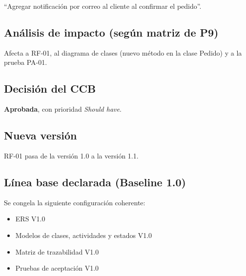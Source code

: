 \documentclass[11pt,a4paper]{article}
\begin{document}
``Agregar notificación por correo al cliente al confirmar el pedido''.

\subsection*{Análisis de impacto (según matriz de P9)}

Afecta a RF-01, al diagrama de clases (nuevo método en la clase Pedido) y a la prueba PA-01.

\subsection*{Decisión del CCB}

\textbf{Aprobada}, con prioridad \emph{Should have}.

\subsection*{Nueva versión}

RF-01 pasa de la versión 1.0 a la versión 1.1.

\subsection*{Línea base declarada (Baseline 1.0)}

Se congela la siguiente configuración coherente:

\begin{itemize}[leftmargin=1.2cm]

\item ERS V1.0

\item Modelos de clases, actividades y estados V1.0

\item Matriz de trazabilidad V1.0

\item Pruebas de aceptación V1.0

\end{itemize}
\end{document}
